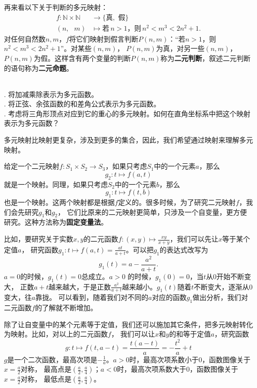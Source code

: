 \documentclass[12pt,UTF8,fontset=none]{ctexbook}
\begin{document}
再来看以下关于判断的多元映射：
\begin{align*}
    f: \mathbb{N} \times \mathbb{N} \,\, &\rightarrow \{\mbox{真}, \,\, \mbox{假}\}  \\
    (n, \,\,\,\, m) &\mapsto \mbox{若}\, n > 1 \mbox{，则}\, n^2 < m^3 < 2n^2 + 1.  
\end{align*}
对任何自然数$n,m$，$f$将它们映射到假言判断$P(n,m)$：“若$n > 1$，则$n^2 < m^3 < 2n^2 + 1$”。对某些$(n,m)$，
$P(n,m)$为真，对另一些$(n,m)$，$P(n,m)$为假。这样含有两个变量的判断$P(n,m)$称为\textbf{二元判断}，叙述二元判断的语句称为\textbf{二元命题}。

\begin{xt}
    \mbox{} \\
    . 将加减乘除表示为多元函数。\\
    . 将正弦、余弦函数的和差角公式表示为多元函数。\\
    . 考虑将三角形顶点对应到它的重心的多元映射。如何在直角坐标系中把这个映射表示为多元函数？
\end{xt}

多元映射比映射更复杂，涉及到更多的集合，因此，我们希望通过映射来理解多元映射。

给定一个二元映射$f:S_1 \times S_2 \rightarrow S_3$，如果只考虑$S_1$中的一个元素$a$，那么
$$ g_2: t \mapsto f(a, t)$$
就是一个映射。同理，如果只考虑$S_2$中的一个元素$b$，那么
$$g_1 : t \mapsto f(t, b)$$
也是一个映射。这两个映射都是根据$f$定义的。很多时候，为了研究二元映射$f$，我们会先研究$g_1$和$g_2$，
它们比原来的二元映射更简单，只涉及一个自变量，更方便研究。这种方法称为\textbf{固定变量法}。

比如，要研究关于实数$x, y$的二元函数$f: (x, y) \mapsto \frac{xy}{x + y}$，我们可以先让$x$等于某个定值$a$，
研究函数$g_1 : t \mapsto f(a, t) = \frac{at}{a + t}$。可以把$g_1$的表达式改写为
$$ g_1(t) = a - \frac{a^2}{a + t}.$$
$a = 0$的时候，$g_1(t) = 0$总成立。$a > 0$ 的时候，$g_1(0) = 0$，当$t$从$0$开始不断变大，
正数$a + t$越来越大，于是正数$\frac{a^2}{a + t}$越来越小。$g_1(t)$随着$t$不断变大，逐渐从$0$变大，往$a$靠拢。
可以看到，随着我们对不同的$a$对应的函数$g_1$做出分析，我们对二元函数$f$的了解就不断增加。

除了让自变量中的某个元素等于定值，我们还可以施加其它条件，把多元映射转化为映射。比如，对以上的二元函数$f$，
我们可以让$x$和$y$的和等于定值$a$，研究函数
$$ g : t \mapsto f(t, a - t) = \frac{t(a - t)}{a} = -\frac{t^2}{a} + t$$
$g$是一个二次函数，最高次项是$-\frac{1}{a}$。$a>0$时，最高次项系数小于$0$，函数图像关于$x = \frac{a}{2}$对称，
最高点是$(\frac{a}{2}, \frac{a}{4})$；$a<0$时，最高次项系数大于$0$，函数图像关于$x = \frac{a}{2}$对称，
最低点是$(\frac{a}{2}, \frac{a}{4})$。
\end{document}
